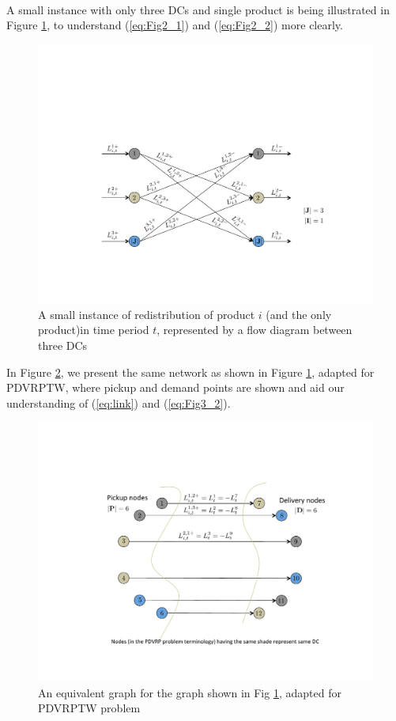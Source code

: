 \documentclass[11pt,letter]{article}
\begin{document}
\\
A small instance with only three DCs and single product is being illustrated in Figure \ref{fig:redistribution_producti_all3DCs}, to understand (\ref{eq:Fig2_1}) and (\ref{eq:Fig2_2}) more clearly.
\begin{figure}[H]
\centering
\includegraphics[trim=3cm 4cm 3cm 7cm, clip=true, totalheight=0.2\textheight]{Fig2.pdf}
\caption{A small instance of redistribution of product $i$ (and the only product)in time period $t$, represented by a flow diagram between three DCs}
\label{fig:redistribution_producti_all3DCs}
\end{figure}

\noindent
In Figure \ref{fig:PDVRP_total12nodes}, we present the same network as shown in Figure \ref{fig:redistribution_producti_all3DCs}, adapted for PDVRPTW, where pickup and demand points are shown and aid our understanding of (\ref{eq:link}) and (\ref{eq:Fig3_2}).
\begin{figure}[H]
\centering
\includegraphics[trim=3cm 3cm 3cm 5cm, clip=true, totalheight=0.2\textheight]{Fig3.pdf}
\caption{An equivalent graph for the graph shown in Fig \ref{fig:redistribution_producti_all3DCs}, adapted for PDVRPTW problem}
\label{fig:PDVRP_total12nodes}
\end{figure}
\end{document}

